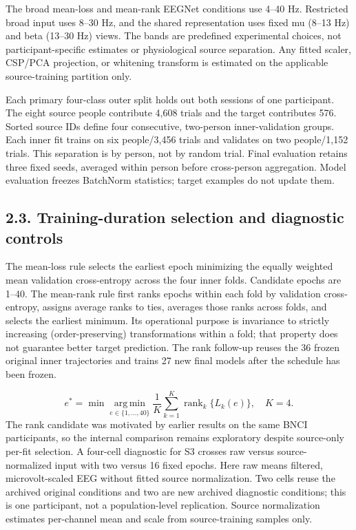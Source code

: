 \documentclass[11pt]{article}
\begin{document}
The broad mean-loss and mean-rank EEGNet conditions use 4--40 Hz. Restricted broad input uses 8--30 Hz, and the shared representation uses fixed mu (8--13 Hz) and beta (13--30 Hz) views. The bands are predefined experimental choices, not participant-specific estimates or physiological source separation. Any fitted scaler, CSP/PCA projection, or whitening transform is estimated on the applicable source-training partition only.

Each primary four-class outer split holds out both sessions of one participant. The eight source people contribute 4,608 trials and the target contributes 576. Sorted source IDs define four consecutive, two-person inner-validation groups. Each inner fit trains on six people/3,456 trials and validates on two people/1,152 trials. This separation is by person, not by random trial. Final evaluation retains three fixed seeds, averaged within person before cross-person aggregation. Model evaluation freezes BatchNorm statistics; target examples do not update them.

\subsection*{2.3. Training-duration selection and diagnostic controls}
The mean-loss rule selects the earliest epoch minimizing the equally weighted mean validation cross-entropy across the four inner folds. Candidate epochs are 1--40. The mean-rank rule first ranks epochs within each fold by validation cross-entropy, assigns average ranks to ties, averages those ranks across folds, and selects the earliest minimum. Its operational purpose is invariance to strictly increasing (order-preserving) transformations within a fold; that property does not guarantee better target prediction. The rank follow-up reuses the 36 frozen original inner trajectories and trains 27 new final models after the schedule has been frozen.

\begin{equation*}
e^*=\min\operatorname*{arg\,min}_{e\in\{1,\ldots,40\}}\frac{1}{K}\sum_{k=1}^{K}\operatorname{rank}_{k}\{L_k(e)\},\quad K=4.
\end{equation*}
The rank candidate was motivated by earlier results on the same BNCI participants, so the internal comparison remains exploratory despite source-only per-fit selection. A four-cell diagnostic for S3 crosses raw versus source-normalized input with two versus 16 fixed epochs. Here raw means filtered, microvolt-scaled EEG without fitted source normalization. Two cells reuse the archived original conditions and two are new archived diagnostic conditions; this is one participant, not a population-level replication. Source normalization estimates per-channel mean and scale from source-training samples only.
\end{document}
